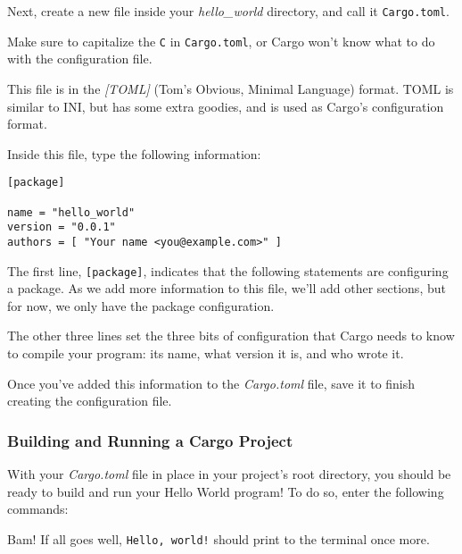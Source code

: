 \documentclass[a4paper,]{book}
\newenvironment{Shaded}{\begin{snugshade}}{\end{snugshade}}
\newcommand{\KeywordTok}[1]{\textcolor[rgb]{0.13,0.29,0.53}{\textbf{{#1}}}}
\newcommand{\NormalTok}[1]{{#1}}
\begin{document}
Next, create a new file inside your \emph{hello\_world} directory, and
call it \texttt{Cargo.toml}.

Make sure to capitalize the \texttt{C} in \texttt{Cargo.toml}, or Cargo
won't know what to do with the configuration file.

This file is in the \emph{{[}TOML{]}} (Tom's Obvious, Minimal Language)
format. TOML is similar to INI, but has some extra goodies, and is used
as Cargo's configuration format.

Inside this file, type the following information:

\begin{verbatim}
[package]

name = "hello_world"
version = "0.0.1"
authors = [ "Your name <you@example.com>" ]
\end{verbatim}

The first line, \texttt{{[}package{]}}, indicates that the following
statements are configuring a package. As we add more information to this
file, we'll add other sections, but for now, we only have the package
configuration.

The other three lines set the three bits of configuration that Cargo
needs to know to compile your program: its name, what version it is, and
who wrote it.

Once you've added this information to the \emph{Cargo.toml} file, save
it to finish creating the configuration file.

\subsubsection{Building and Running a Cargo
Project}\label{building-and-running-a-cargo-project}

With your \emph{Cargo.toml} file in place in your project's root
directory, you should be ready to build and run your Hello World
program! To do so, enter the following commands:

\begin{Shaded}
\end{Shaded}

Bam! If all goes well, \texttt{Hello,\ world!} should print to the
terminal once more.
\end{document}
